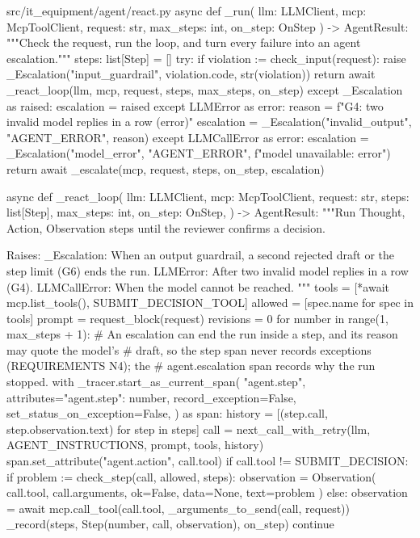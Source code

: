 \documentclass[11pt,letterpaper]{article}
\renewcommand{\_}{\textunderscore\allowbreak}
\begin{document}
\begin{codebox}{src/it_equipment/agent/react.py}
async def _run(
    llm: LLMClient, mcp: McpToolClient, request: str, max_steps: int, on_step: OnStep
) -> AgentResult:
    """Check the request, run the loop, and turn every failure into an agent escalation."""
    steps: list[Step] = []
    try:
        if violation := check_input(request):
            raise _Escalation("input_guardrail", violation.code, str(violation))
        return await _react_loop(llm, mcp, request, steps, max_steps, on_step)
    except _Escalation as raised:
        escalation = raised
    except LLMError as error:
        reason = f"G4: two invalid model replies in a row ({error})"
        escalation = _Escalation("invalid_output", "AGENT_ERROR", reason)
    except LLMCallError as error:
        escalation = _Escalation("model_error", "AGENT_ERROR", f"model unavailable: {error}")
    return await _escalate(mcp, request, steps, on_step, escalation)


async def _react_loop(
    llm: LLMClient,
    mcp: McpToolClient,
    request: str,
    steps: list[Step],
    max_steps: int,
    on_step: OnStep,
) -> AgentResult:
    """Run Thought, Action, Observation steps until the reviewer confirms a decision.

    Raises:
        _Escalation: When an output guardrail, a second rejected draft or the step limit (G6)
            ends the run.
        LLMError: After two invalid model replies in a row (G4).
        LLMCallError: When the model cannot be reached.
    """
    tools = [*await mcp.list_tools(), SUBMIT_DECISION_TOOL]
    allowed = [spec.name for spec in tools]
    prompt = request_block(request)
    revisions = 0
    for number in range(1, max_steps + 1):
        # An escalation can end the run inside a step, and its reason may quote the model's
        # draft, so the step span never records exceptions (REQUIREMENTS N4); the
        # agent.escalation span records why the run stopped.
        with _tracer.start_as_current_span(
            "agent.step",
            attributes={"agent.step": number},
            record_exception=False,
            set_status_on_exception=False,
        ) as span:
            history = [(step.call, step.observation.text) for step in steps]
            call = next_call_with_retry(llm, AGENT_INSTRUCTIONS, prompt, tools, history)
            span.set_attribute("agent.action", call.tool)
            if call.tool != SUBMIT_DECISION:
                if problem := check_step(call, allowed, steps):
                    observation = Observation(
                        call.tool, call.arguments, ok=False, data=None, text=problem
                    )
                else:
                    observation = await mcp.call_tool(call.tool, _arguments_to_send(call, request))
                _record(steps, Step(number, call, observation), on_step)
                continue


\end{codebox}
\end{document}
